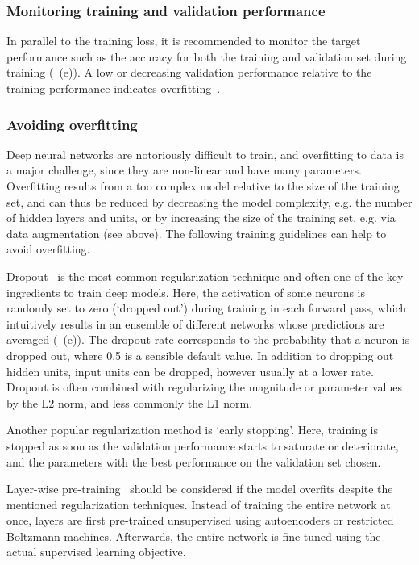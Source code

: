 \subsubsection{Monitoring training and validation performance}
In parallel to the training loss, it is recommended to monitor the target performance such as the accuracy for both the training and validation set during training (~(e)). A low or decreasing validation performance relative to the training performance indicates overfitting~\citep{bengio_practical_2012,karpathy_cs231n_2016}.

\subsubsection{Avoiding overfitting} \label{sec:dl_overfit}
Deep neural networks are notoriously difficult to train, and overfitting to data is a major challenge, since they are non-linear and have many parameters. Overfitting results from a too complex model relative to the size of the training set, and can thus be reduced by decreasing the model complexity, e.g. the number of hidden layers and units, or by increasing the size of the training set, e.g. via data augmentation (see above). The following training guidelines can help to avoid overfitting.

Dropout~\citep{srivastava_dropout:_2014} is the most common regularization technique and often one of the key ingredients to train deep models. Here, the activation of some neurons is randomly set to zero (`dropped out') during training in each forward pass, which intuitively results in an ensemble of different networks whose predictions are averaged (~(e)). The dropout rate corresponds to the probability that a neuron is dropped out, where 0.5 is a sensible default value. In addition to dropping out hidden units, input units can be dropped, however usually at a lower rate. Dropout is often combined with regularizing the magnitude or parameter values by the L2 norm, and less commonly the L1 norm.

Another popular regularization method is `early stopping'. Here, training is stopped as soon as the validation performance starts to saturate or deteriorate, and the parameters with the best performance on the validation set chosen.

Layer-wise pre-training~\citep{bengio_greedy_2007,salakhutdinov_efficient_2012} should be considered if the model overfits despite the mentioned regularization techniques. Instead of training the entire network at once, layers are first pre-trained unsupervised using autoencoders or restricted Boltzmann machines. Afterwards, the entire network is fine-tuned using the actual supervised learning objective.

